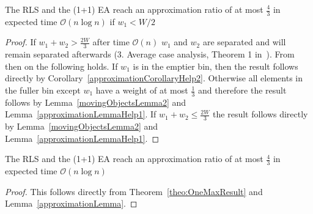 \begin{lemma}\label{approximationLemma}
    The RLS and the (1+1) EA reach an approximation ratio of at most $\frac{4}{3}$ in expected time $\mathcal{O}(n\log{}n)$ if $w_1 < W/2$
\end{lemma}
\begin{proof}    
    If \(w_1+w_2 > \frac{2W}{3}\) after time $\mathcal{O}(n)$ $w_1$ and $w_2$ are separated and will remain separated afterwards (3. Average case analysis, Theorem 1 in~\cite{diekert2005stacs}).
    From then on the following holds.
    If $w_1$ is in the emptier bin, then the result follows directly by Corollary~\ref{approximationCorollaryHelp2}.
    Otherwise all elements in the fuller bin except $w_1$ have a weight of at most $\frac{1}{3}$ and therefore the result follows by Lemma~\ref{movingObjectsLemma2} and Lemma~\ref{approximationLemmaHelp1}.
    If \(w_1+w_2 \le \frac{2W}{3}\) the result follows directly by Lemma~\ref{movingObjectsLemma2} and Lemma~\ref{approximationLemmaHelp1}.
\end{proof}

\begin{corollary}
    The RLS and the (1+1) EA reach an approximation ratio of at most $\frac{4}{3}$ in expected time $\mathcal{O}(n\log{}n)$
\end{corollary}
\begin{proof}
    This follows directly from Theorem~\ref{theo:OneMaxResult} and Lemma~\ref{approximationLemma}.
\end{proof}

